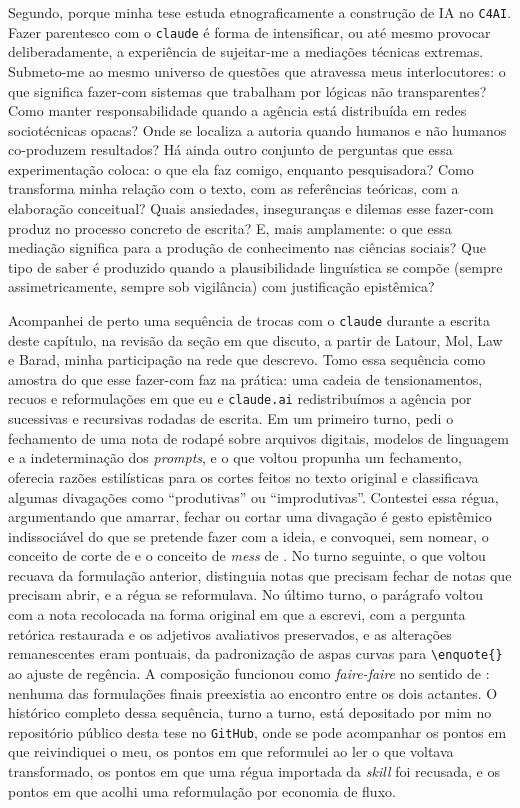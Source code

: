 Segundo, porque minha tese estuda etnograficamente a construção de IA no \texttt{C4AI}. Fazer parentesco com o \texttt{claude} é forma de intensificar, ou até mesmo provocar deliberadamente, a experiência de sujeitar-me a mediações técnicas extremas. Submeto-me ao mesmo universo de questões que atravessa meus interlocutores: o que significa fazer-com sistemas que trabalham por lógicas não transparentes? Como manter responsabilidade quando a agência está distribuída em redes sociotécnicas opacas? Onde se localiza a autoria quando humanos e não humanos co-produzem resultados? Há ainda outro conjunto de perguntas que essa experimentação coloca: o que ela faz comigo, enquanto pesquisadora? Como transforma minha relação com o texto, com as referências teóricas, com a elaboração conceitual? Quais ansiedades, inseguranças e dilemas esse fazer-com produz no processo concreto de escrita? E, mais amplamente: o que essa mediação significa para a produção de conhecimento nas ciências sociais? Que tipo de saber é produzido quando a plausibilidade linguística se compõe (sempre assimetricamente, sempre sob vigilância) com justificação epistêmica?

Acompanhei de perto uma sequência de trocas com o \texttt{claude} durante a escrita deste capítulo, na revisão da seção em que discuto, a partir de Latour, Mol, Law e Barad, minha participação na rede que descrevo. Tomo essa sequência como amostra do que esse fazer-com faz na prática: uma cadeia de tensionamentos, recuos e reformulações em que eu e \texttt{claude.ai} redistribuímos a agência por sucessivas e recursivas rodadas de escrita. Em um primeiro turno, pedi o fechamento de uma nota de rodapé sobre arquivos digitais, modelos de linguagem e a indeterminação dos \textit{prompts}, e o que voltou propunha um fechamento, oferecia razões estilísticas para os cortes feitos no texto original e classificava algumas divagações como \enquote{produtivas} ou \enquote{improdutivas}. Contestei essa régua, argumentando que amarrar, fechar ou cortar uma divagação é gesto epistêmico indissociável do que se pretende fazer com a ideia, e convoquei, sem nomear, o conceito de corte de \textcite{strathern2011cortando} e o conceito de \textit{mess} de \textcite{Law2004After}. No turno seguinte, o que voltou recuava da formulação anterior, distinguia notas que precisam fechar de notas que precisam abrir, e a régua se reformulava. No último turno, o parágrafo voltou com a nota recolocada na forma original em que a escrevi, com a pergunta retórica restaurada e os adjetivos avaliativos preservados, e as alterações remanescentes eram pontuais, da padronização de aspas curvas para \texttt{\textbackslash enquote\{\}} ao ajuste de regência. A composição funcionou como \textit{faire-faire} no sentido de \textcite{Latour2017Esperanca}: nenhuma das formulações finais preexistia ao encontro entre os dois actantes. O histórico completo dessa sequência, turno a turno, está depositado por mim no repositório público desta tese no \texttt{GitHub}, onde se pode acompanhar os pontos em que reivindiquei o meu, os pontos em que reformulei ao ler o que voltava transformado, os pontos em que uma régua importada da \textit{skill} foi recusada, e os pontos em que acolhi uma reformulação por economia de fluxo.

